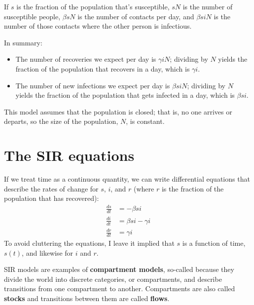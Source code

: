 \documentclass[12pt]{book}
\theoremstyle{exercise}
\begin{document}
If $s$ is the fraction of the population that's susceptible, $s N$ is the number of susceptible people, $\beta s N$ is the number of contacts per day, and $\beta s i N$ is the number of those contacts where the other person is infectious.


In summary:

\begin{itemize}

\item The number of recoveries we expect per day is $\gamma i N$; dividing by $N$ yields the fraction of the population that recovers in a day, which is $\gamma i$.

\item The number of new infections we expect per day is $\beta s i N$; dividing by $N$ yields the fraction of the population that gets infected in a day, which is $\beta s i$.

\end{itemize}

This model assumes that the population is closed; that is, no one arrives or departs, so the size of the population, $N$, is constant.


\section{The SIR equations}
\label{sireqn}

If we treat time as a continuous quantity, we can write differential equations that describe the rates of change for $s$, $i$, and $r$ (where $r$ is the fraction of the population that has recovered):
%
\begin{align*}
\frac{ds}{dt} &= -\beta s i \\
\frac{di}{dt} &= \beta s i - \gamma i\\
\frac{dr}{dt} &= \gamma i
\end{align*}
%
To avoid cluttering the equations, I leave it implied that $s$ is a function of time, $s(t)$, and likewise for $i$ and $r$.

SIR models are examples of {\bf compartment models}, so-called because they divide the world into discrete categories, or compartments, and describe transitions from one compartment to another.  Compartments are also called {\bf stocks} and transitions between them are called {\bf flows}.

\end{document}
